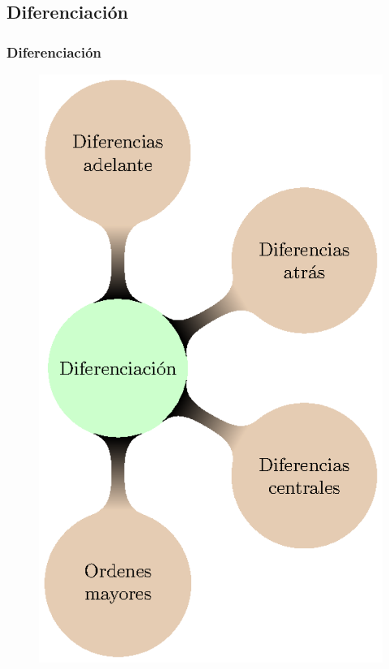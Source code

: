 \subsection*{Diferenciación}
\begin{frame}[fragile]
\frametitle{Diferenciación}
\begin{figure}
    \centering
    \includegraphics[scale=0.6]{Imagenes/MapaMental_Tema2_03.eps}
\end{figure}
\end{frame}
